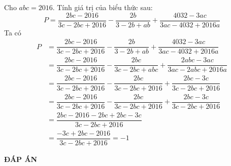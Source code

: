 \begin{ex}%
Cho $abc=2016$. Tính giá trị của biểu thức sau:
	\[P = \dfrac{2bc - 2016}{3c-2bc+2016}-\dfrac{2b}{3-2b+ab}+\dfrac{4032-3ac}{3ac-4032+2016a}\]
\loigiai
	{
		Ta có 
		\begin{align*}
			P &= \dfrac{2bc - 2016}{3c-2bc+2016}-\dfrac{2b}{3-2b+ab}+\dfrac{4032-3ac}{3ac-4032+2016a} \\
			&= \dfrac{2bc - 2016}{3c-2bc+2016}-\dfrac{2bc}{3c-2bc+abc}+\dfrac{2abc-3ac}{3ac-2abc+2016a} \\
			&= \dfrac{2bc - 2016}{3c-2bc+2016}-\dfrac{2bc}{3c-2bc+2016}+\dfrac{2bc-3c}{3c-2bc+2016} \\
			&= \dfrac{2bc - 2016}{3c-2bc+2016}-\dfrac{2bc}{3c-2bc+2016}+\dfrac{2bc-3c}{3c-2bc+2016} \\
			&= \dfrac{2bc - 2016-2bc+2bc-3c}{3c-2bc+2016} \\
			&= \dfrac{-3c+2bc - 2016}{3c-2bc+2016}= -1
		\end{align*}
	}
\end{ex}
\newpage
\begin{center}
	\textbf{ĐÁP ÁN}
\end{center}
\begin{multicols}{10}
	 
\end{multicols}

